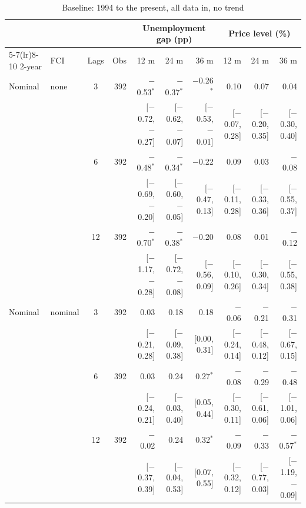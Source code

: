\begin{table}[p]\centering\footnotesize\setlength{\tabcolsep}{2.2pt}
\caption{Baseline: 1994 to the present, all data in, no trend}\label{tab:B}
\begin{tabular}{llcrrrrrrr}\toprule
 & & & & \multicolumn{3}{c}{Unemployment gap (pp)} & \multicolumn{3}{c}{Price level (\%)}\\ \cmidrule(lr){5-7}\cmidrule(lr){8-10}
2-year & FCI & Lags & Obs & 12 m & 24 m & 36 m & 12 m & 24 m & 36 m\\ \midrule
Nominal & none & 3 & 392 & $-$0.53$^{*}$ & $-$0.37$^{*}$ & $-$0.26$^{*}$ & 0.10 & 0.07 & 0.04\\
 & & & & {\scriptsize [$-$0.72, $-$0.27]} & {\scriptsize [$-$0.62, $-$0.07]} & {\scriptsize [$-$0.53, $-$0.01]} & {\scriptsize [$-$0.07, 0.28]} & {\scriptsize [$-$0.20, 0.35]} & {\scriptsize [$-$0.30, 0.40]}\\
 &  & 6 & 392 & $-$0.48$^{*}$ & $-$0.34$^{*}$ & $-$0.22 & 0.09 & 0.03 & $-$0.08\\
 & & & & {\scriptsize [$-$0.69, $-$0.20]} & {\scriptsize [$-$0.60, $-$0.05]} & {\scriptsize [$-$0.47, 0.13]} & {\scriptsize [$-$0.11, 0.28]} & {\scriptsize [$-$0.33, 0.36]} & {\scriptsize [$-$0.55, 0.37]}\\
 &  & 12 & 392 & $-$0.70$^{*}$ & $-$0.38$^{*}$ & $-$0.20 & 0.08 & 0.01 & $-$0.12\\
 & & & & {\scriptsize [$-$1.17, $-$0.28]} & {\scriptsize [$-$0.72, $-$0.08]} & {\scriptsize [$-$0.56, 0.09]} & {\scriptsize [$-$0.10, 0.26]} & {\scriptsize [$-$0.30, 0.34]} & {\scriptsize [$-$0.55, 0.38]}\\
Nominal & nominal & 3 & 392 & 0.03 & 0.18 & 0.18 & $-$0.06 & $-$0.21 & $-$0.31\\
 & & & & {\scriptsize [$-$0.21, 0.28]} & {\scriptsize [$-$0.09, 0.38]} & {\scriptsize [0.00, 0.31]} & {\scriptsize [$-$0.24, 0.14]} & {\scriptsize [$-$0.48, 0.12]} & {\scriptsize [$-$0.67, 0.15]}\\
 &  & 6 & 392 & 0.03 & 0.24 & 0.27$^{*}$ & $-$0.08 & $-$0.29 & $-$0.48\\
 & & & & {\scriptsize [$-$0.24, 0.21]} & {\scriptsize [$-$0.03, 0.40]} & {\scriptsize [0.05, 0.44]} & {\scriptsize [$-$0.30, 0.11]} & {\scriptsize [$-$0.61, 0.06]} & {\scriptsize [$-$1.01, 0.06]}\\
 &  & 12 & 392 & $-$0.02 & 0.24 & 0.32$^{*}$ & $-$0.09 & $-$0.33 & $-$0.57$^{*}$\\
 & & & & {\scriptsize [$-$0.37, 0.39]} & {\scriptsize [$-$0.04, 0.53]} & {\scriptsize [0.07, 0.55]} & {\scriptsize [$-$0.32, 0.12]} & {\scriptsize [$-$0.77, 0.03]} & {\scriptsize [$-$1.19, $-$0.09]}\\

\end{tabular}
\end{table}
